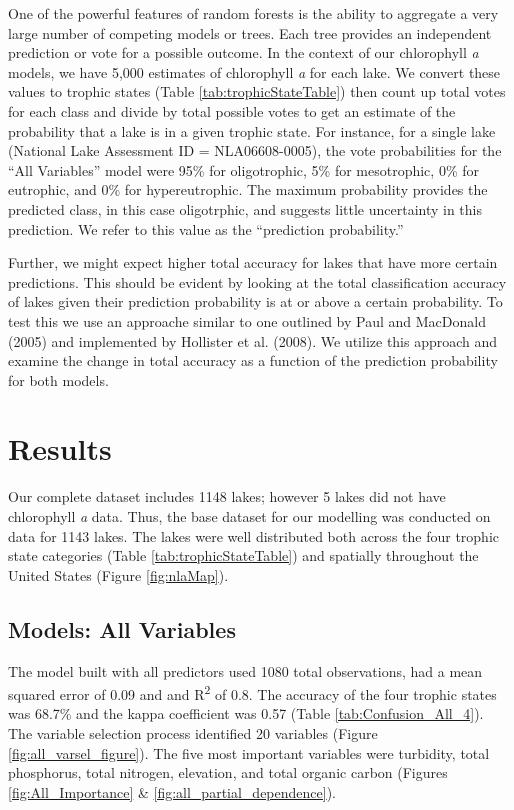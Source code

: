 \documentclass[11pt,]{article}
\begin{document}
One of the powerful features of random forests is the ability to
aggregate a very large number of competing models or trees. Each tree
provides an independent prediction or vote for a possible outcome. In
the context of our chlorophyll \emph{a} models, we have 5,000 estimates
of chlorophyll \emph{a} for each lake. We convert these values to
trophic states (Table \ref {tab:trophicStateTable}) then count up total
votes for each class and divide by total possible votes to get an
estimate of the probability that a lake is in a given trophic state. For
instance, for a single lake (National Lake Assessment ID =
NLA06608-0005), the vote probabilities for the ``All Variables'' model
were 95\% for oligotrophic, 5\% for mesotrophic, 0\% for eutrophic, and
0\% for hypereutrophic. The maximum probability provides the predicted
class, in this case oligotrphic, and suggests little uncertainty in this
prediction. We refer to this value as the ``prediction probability.''

Further, we might expect higher total accuracy for lakes that have more
certain predictions. This should be evident by looking at the total
classification accuracy of lakes given their prediction probability is
at or above a certain probability. To test this we use an approache
similar to one outlined by Paul and MacDonald (2005) and implemented by
Hollister et al. (2008). We utilize this approach and examine the change
in total accuracy as a function of the prediction probability for both
models.

\section{Results}\label{results}

Our complete dataset includes 1148 lakes; however 5 lakes did not have
chlorophyll \emph{a} data. Thus, the base dataset for our modelling was
conducted on data for 1143 lakes. The lakes were well distributed both
across the four trophic state categories (Table
\ref{tab:trophicStateTable}) and spatially throughout the United States
(Figure \ref{fig:nlaMap}).

\subsection{Models: All Variables}\label{models-all-variables}

The model built with all predictors used 1080 total observations, had a
mean squared error of 0.09 and and R\textsuperscript{2} of 0.8. The
accuracy of the four trophic states was 68.7\% and the kappa coefficient
was 0.57 (Table \ref{tab:Confusion_All_4}). The variable selection
process identified 20 variables (Figure \ref{fig:all_varsel_figure}).
The five most important variables were turbidity, total phosphorus,
total nitrogen, elevation, and total organic carbon (Figures
\ref{fig:All_Importance} \& \ref{fig:all_partial_dependence}).
\end{document}
